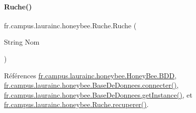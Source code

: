 \mbox{\label{classfr_1_1campus_1_1laurainc_1_1honeybee_1_1_ruche_a969fe0f6a0e3176a86b498306dc7f0b0}} 
\paragraph{\texorpdfstring{Ruche()}{Ruche()}\hspace{0.1cm}{\footnotesize\ttfamily [3/4]}}
{\footnotesize\ttfamily fr.\+campus.\+laurainc.\+honeybee.\+Ruche.\+Ruche (\begin{DoxyParamCaption}\item[{String}]{Nom }\end{DoxyParamCaption})}



Références \hyperlink{classfr_1_1campus_1_1laurainc_1_1honeybee_1_1_honey_bee_abfb4f6cc1c8bb793c37ccb8408abc51c}{fr.\+campus.\+laurainc.\+honeybee.\+Honey\+Bee.\+B\+DD}, \hyperlink{classfr_1_1campus_1_1laurainc_1_1honeybee_1_1_base_de_donnees_a08564ea7dccde161d6eac4b8879401bb}{fr.\+campus.\+laurainc.\+honeybee.\+Base\+De\+Donnees.\+connecter()}, \hyperlink{classfr_1_1campus_1_1laurainc_1_1honeybee_1_1_base_de_donnees_a9c2484cfb87f90e46cf878eb7803abb2}{fr.\+campus.\+laurainc.\+honeybee.\+Base\+De\+Donnees.\+get\+Instance()}, et \hyperlink{classfr_1_1campus_1_1laurainc_1_1honeybee_1_1_ruche_a7a99d3c585f2c507eb2c6c265a5bb1fe}{fr.\+campus.\+laurainc.\+honeybee.\+Ruche.\+recuperer()}.


